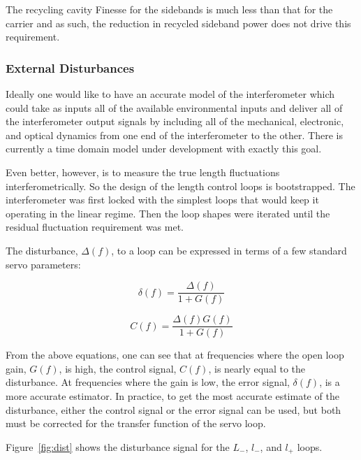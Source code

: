 The recycling cavity Finesse for the sidebands is much less than that
for the carrier and as such, the reduction in recycled sideband power
does not drive this requirement.


\subsubsection{External Disturbances}

Ideally one would like to have an accurate model of the interferometer
which could take as inputs all of the available environmental inputs
and deliver all of the interferometer output signals by including
all of the mechanical, electronic, and optical dynamics from one
end of the interferometer to the other. There is currently a time domain
model under development \cite{e2e:Moriond} with exactly this goal.

Even better, however, is to measure the true length fluctuations
interferometrically. So the design of the length control loops is
bootstrapped. The interferometer was first locked with the simplest
loops that would keep it operating in the linear regime. Then the
loop shapes were iterated until the residual fluctuation requirement
was met.

The disturbance, $\Delta(f)$, to a loop can be expressed in terms 
of a few standard servo parameters:


\begin{equation}
\delta(f) = \frac{\Delta(f)}{1+G(f)}
\end{equation}

\begin{equation}
C(f) = \frac{\Delta(f) G(f)}{1+G(f)}
\end{equation}

From the above equations, one can see that at frequencies where the
open loop gain, $G(f)$, is high, the control signal, $C(f)$, is nearly
equal to the disturbance. At frequencies where the gain is low, the
error signal, $\delta (f)$, is a more accurate estimator. In practice,
to get the most accurate estimate of the disturbance, either the
control signal or the error signal can be used, but both must be corrected
for the transfer function of the servo loop.

Figure~\ref{fig:dist} shows the disturbance signal for the $L_-$, $l_-$, and $l_+$ loops.

